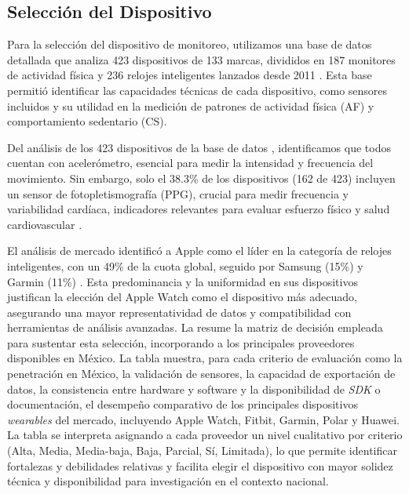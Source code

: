 \subsection{Selección del Dispositivo}
\label{subsec:seleccion_dispositivo}

Para la selección del dispositivo de monitoreo, utilizamos una base de datos detallada que analiza 423 dispositivos de 133 marcas, divididos en 187 monitores de actividad física y 236 relojes inteligentes lanzados desde 2011 \cite{Henriksen2021ReplicationData}. Esta base permitió identificar las capacidades técnicas de cada dispositivo, como sensores incluidos y su utilidad en la medición de patrones de actividad física (AF) y comportamiento sedentario (CS).

Del análisis de los 423 dispositivos de la base de datos \cite{Henriksen2021ReplicationData}, identificamos que todos cuentan con acelerómetro, esencial para medir la intensidad y frecuencia del movimiento. Sin embargo, solo el 38.3\% de los dispositivos (162 de 423) incluyen un sensor de fotopletismografía (PPG), crucial para medir frecuencia y variabilidad cardíaca, indicadores relevantes para evaluar esfuerzo físico y salud cardiovascular \cite{Pinto2023Physiology}. 

El análisis de mercado identificó a Apple como el líder en la categoría de relojes inteligentes, con un 49\% de la cuota global, seguido por Samsung (15\%) y Garmin (11\%) \cite{Canalys2024Wearables}. Esta predominancia y la uniformidad en sus dispositivos justifican la elección del Apple Watch como el dispositivo más adecuado, asegurando una mayor representatividad de datos y compatibilidad con herramientas de análisis avanzadas. La  resume la matriz de decisión empleada para sustentar esta selección, incorporando a los principales proveedores disponibles en México. La tabla muestra, para cada criterio de evaluación como la penetración en México, la validación de sensores, la capacidad de exportación de datos, la consistencia entre hardware y software y la disponibilidad de \textit{SDK} o documentación, el desempeño comparativo de los principales dispositivos \textit{wearables} del mercado, incluyendo Apple Watch, Fitbit, Garmin, Polar y Huawei. La tabla se interpreta asignando a cada proveedor un nivel cualitativo por criterio (Alta, Media, Media-baja, Baja, Parcial, Sí, Limitada), lo que permite identificar fortalezas y debilidades relativas y facilita elegir el dispositivo con mayor solidez técnica y disponibilidad para investigación en el contexto nacional.

